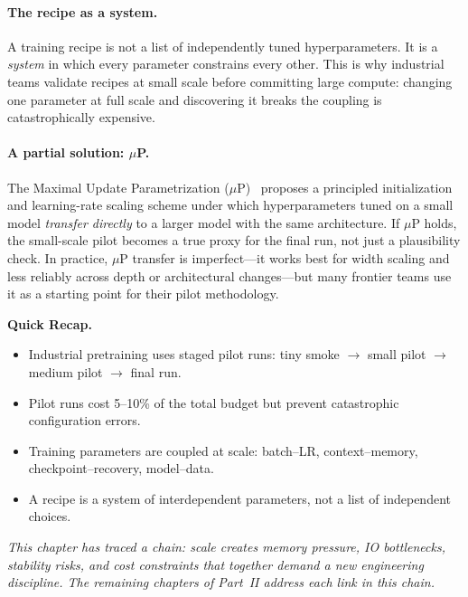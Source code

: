 \paragraph{The recipe as a system.} A training recipe is not a list of independently tuned hyperparameters. It is a \emph{system} in which every parameter constrains every other. This is why industrial teams validate recipes at small scale before committing large compute: changing one parameter at full scale and discovering it breaks the coupling is catastrophically expensive.

\paragraph{A partial solution: $\mu$P.} The Maximal Update Parametrization ($\mu$P)~\cite{yang2022tensor} proposes a principled initialization and learning-rate scaling scheme under which hyperparameters tuned on a small model \emph{transfer directly} to a larger model with the same architecture. If $\mu$P holds, the small-scale pilot becomes a true proxy for the final run, not just a plausibility check. In practice, $\mu$P transfer is imperfect---it works best for width scaling and less reliably across depth or architectural changes---but many frontier teams use it as a starting point for their pilot methodology.

\begin{quickrecap}
\textbf{Quick Recap.}
\begin{itemize}[nosep,leftmargin=1.5em]
  \item Industrial pretraining uses staged pilot runs: tiny smoke $\to$ small pilot $\to$ medium pilot $\to$ final run.
  \item Pilot runs cost 5--10\% of the total budget but prevent catastrophic configuration errors.
  \item Training parameters are coupled at scale: batch--LR, context--memory, checkpoint--recovery, model--data.
  \item A recipe is a system of interdependent parameters, not a list of independent choices.
\end{itemize}
\textit{This chapter has traced a chain: scale creates memory pressure, IO bottlenecks, stability risks, and cost constraints that together demand a new engineering discipline. The remaining chapters of Part~II address each link in this chain.}
\end{quickrecap}


